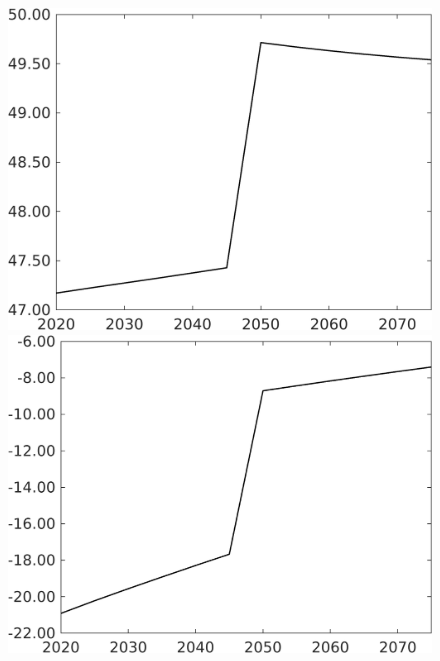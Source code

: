 \documentclass[12pt]{article}
\begin{document}
\begin{figure}[h!!]
\begin{minipage}[]{0.32\textwidth}
	\end{minipage}		
	\begin{minipage}[]{0.32\textwidth}
		\includegraphics[width=1\textwidth]{../../codding_model/own_basedOnFried/optimalPol_010922_revision/figures/all_13Sept22/CompTaufPER_bytaul_Reg0_sff_spillover0_nsk0_xgr0_knspil1_sep0_LFlimit1_emsbase0_countec0_GovRev0_etaa0.79_lgd0.png}
	\end{minipage}		
	\begin{minipage}[]{0.32\textwidth}
		\includegraphics[width=1\textwidth]{../../codding_model/own_basedOnFried/optimalPol_010922_revision/figures/all_13Sept22/CompTaufPER_bytaul_Reg0_sg_spillover0_nsk0_xgr0_knspil1_sep0_LFlimit1_emsbase0_countec0_GovRev0_etaa0.79_lgd0.png}

\end{minipage}
\end{figure}
\end{document}

